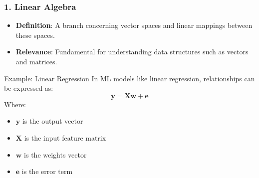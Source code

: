\documentclass{beamer}
\begin{document}
\begin{frame}[fragile]
    \frametitle{1. Linear Algebra}
    
    \begin{itemize}
        \item \textbf{Definition}: A branch concerning vector spaces and linear mappings between these spaces.
        \item \textbf{Relevance}: Fundamental for understanding data structures such as vectors and matrices.
    \end{itemize}
    
    \begin{block}{Example: Linear Regression}
        In ML models like linear regression, relationships can be expressed as:
        \begin{equation}
            \mathbf{y} = \mathbf{X} \mathbf{w} + \mathbf{e}
        \end{equation}
        Where:
        \begin{itemize}
            \item $\mathbf{y}$ is the output vector
            \item $\mathbf{X}$ is the input feature matrix
            \item $\mathbf{w}$ is the weights vector
            \item $\mathbf{e}$ is the error term
        \end{itemize}
    \end{block}
\end{frame}
\end{document}
